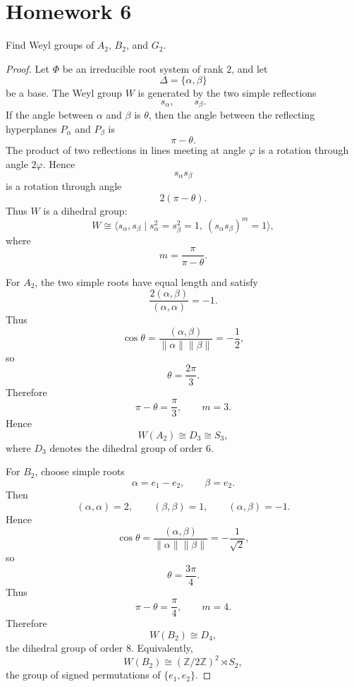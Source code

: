\section{Homework 6}

\begin{exercise}
    Find Weyl groups of \(A_2\), \(B_2\), and \(G_2\).
\end{exercise}

\begin{proof}
    Let \(\Phi\) be an irreducible root system of rank \(2\), and let
    \[
        \Delta=\{\alpha,\beta\}
    \]
    be a base. The Weyl group \(W\) is generated by the two simple reflections
    \[
        s_\alpha,\qquad s_\beta.
    \]
    If the angle between \(\alpha\) and \(\beta\) is \(\theta\), then the angle between
    the reflecting hyperplanes \(P_\alpha\) and \(P_\beta\) is
    \[
        \pi-\theta.
    \]
    The product of two reflections in lines meeting at angle \(\varphi\) is a
    rotation through angle \(2\varphi\). Hence
    \[
        s_\alpha s_\beta
    \]
    is a rotation through angle
    \[
        2(\pi-\theta).
    \]
    Thus \(W\) is a dihedral group:
    \[
        W\cong \langle s_\alpha,s_\beta
        \mid s_\alpha^2=s_\beta^2=1,\ (s_\alpha s_\beta)^m=1\rangle,
    \]
    where
    \[
        m=\frac{\pi}{\pi-\theta}.
    \]
    
    For \(A_2\), the two simple roots have equal length and satisfy
    \[
        \frac{2(\alpha,\beta)}{(\alpha,\alpha)}=-1.
    \]
    Thus
    \[
        \cos\theta=\frac{(\alpha,\beta)}
        {\|\alpha\|\|\beta\|}=-\frac12,
    \]
    so
    \[
        \theta=\frac{2\pi}{3}.
    \]
    Therefore
    \[
        \pi-\theta=\frac{\pi}{3},
        \qquad
        m=3.
    \]
    Hence
    \[
        W(A_2)\cong D_3\cong S_3,
    \]
    where \(D_3\) denotes the dihedral group of order \(6\).
    
    For \(B_2\), choose simple roots
    \[
        \alpha=e_1-e_2,\qquad \beta=e_2.
    \]
    Then
    \[
        (\alpha,\alpha)=2,\qquad (\beta,\beta)=1,\qquad
        (\alpha,\beta)=-1.
    \]
    Hence
    \[
        \cos\theta
        =
        \frac{(\alpha,\beta)}{\|\alpha\|\|\beta\|}
        =
        -\frac{1}{\sqrt2},
    \]
    so
    \[
        \theta=\frac{3\pi}{4}.
    \]
    Thus
    \[
        \pi-\theta=\frac{\pi}{4},
        \qquad
        m=4.
    \]
    Therefore
    \[
        W(B_2)\cong D_4,
    \]
    the dihedral group of order \(8\). Equivalently,
    \[
        W(B_2)\cong (\mathbb Z/2\mathbb Z)^2\rtimes S_2,
    \]
    the group of signed permutations of \(\{e_1,e_2\}\).
    

\end{proof}
